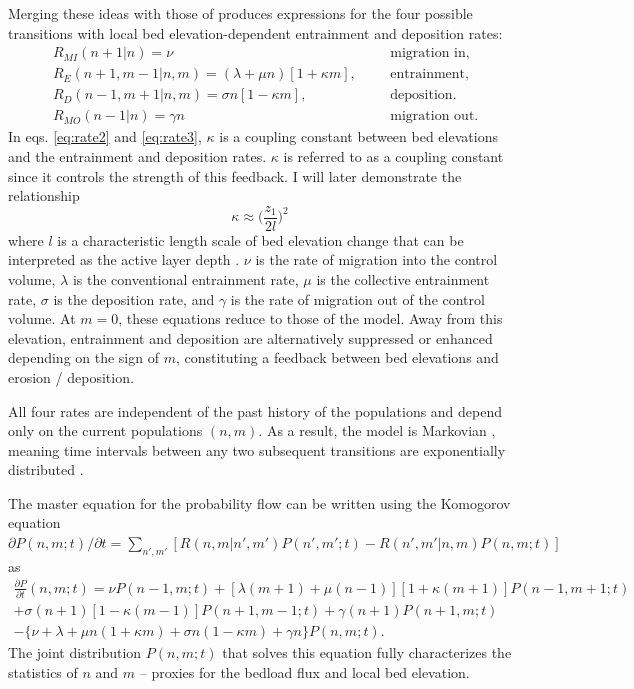 Merging these ideas with those of \citet{Ancey2008} produces expressions for the four possible transitions with local bed elevation-dependent entrainment and deposition rates:
\begin{align}
	&R_{MI}(n+1|n) = \nu && &\text{migration in}, \label{eq:rate1}\\
	&R_E(n+1,m-1|n,m)=(\lambda + \mu n)[1 + \kappa m], && &\text{entrainment}, \label{eq:rate2}\\
	&R_D(n-1,m+1|n,m)=\sigma n [1- \kappa m ], && &\text{deposition}. \label{eq:rate3} \\
	&R_{MO}(n-1|n) =\gamma n && &\text{migration out} \label{eq:rate4}.
\end{align}
In eqs. \ref{eq:rate2} and \ref{eq:rate3}, $\kappa$ is a coupling constant between bed elevations and the entrainment and deposition rates.
$\kappa$ is referred to as a coupling constant since it controls the strength of this feedback. I will later demonstrate the relationship
\begin{equation}\kappa \approx \big(\frac{z_1}{2l}\big)^2 \label{eq:active}
\end{equation}
where $l$ is a characteristic length scale of bed elevation change that can be interpreted as the active layer depth \citep{Wong2007,Church2017}.
$\nu$ is the rate of migration into the control volume, $\lambda$ is the conventional entrainment rate, $\mu$ is the collective entrainment rate, $\sigma$ is the deposition rate, and $\gamma$ is the rate of migration out of the control volume.
At $m=0$, these equations reduce to those of the \citet{Ancey2008} model.
Away from this elevation, entrainment and deposition are alternatively suppressed or enhanced depending on the sign of $m$, constituting a feedback between bed elevations and erosion / deposition.

All four rates are independent of the past history of the populations and depend only on the current populations $(n,m)$. 
As a result, the model is Markovian \citep{Cox1965, VanKampen2007}, meaning time intervals between any two subsequent transitions are exponentially distributed \citep{Gillespie2007}.

The master equation for the probability flow can be written using the Komogorov equation
 $\partial P(n,m;t)/\partial t = 
\sum_{n',m'} [R(n,m|n',m')P(n',m';t)-R(n',m'|n,m)P(n,m;t)]$ \citep{Cox1965, Gillespie1991, Ancey2008} as 
\begin{multline}
	\frac{\partial P}{\partial t}(n,m;t) =  
	\nu P(n-1,m;t) + [\lambda(m+1) + \mu(n-1)][1+\kappa(m+1)]P(n-1,m+1;t)\\  
	+ \sigma(n+1)[1-\kappa(m-1)]P(n+1,m-1;t) + \gamma(n+1) P(n+1,m;t) \\
	- 
	\{ \nu + \lambda+ \mu n (1+\kappa m) +  \sigma n ( 1- \kappa m) + \gamma n \}P(n,m;t).
	\label{eq:elemaster}
\end{multline}
The joint distribution $P(n,m;t)$ that solves this equation fully characterizes the statistics of $n$ and $m$ -- proxies for the bedload flux and local bed elevation.

